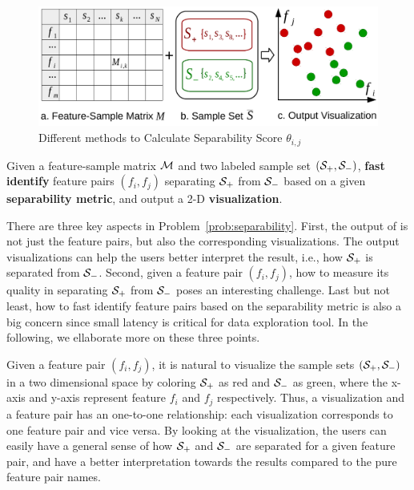 \begin{figure}[h]
	\centering
	\includegraphics[width=\linewidth]{fig/workflow.pdf}
\caption{Different methods to Calculate Separability Score $\theta_{i,j}$}
\label{fig:workflow}
\end{figure} 


\begin{formulation}[Separability]\label{prob:separability}
Given a feature-sample matrix $\mathcal{M}$ and two labeled sample set $(\mathcal{S}_+,\mathcal{S}_-)$, \textbf{fast identify} \topk feature pairs $(f_i,f_j)$ separating $\mathcal{S}_+$ from $\mathcal{S}_-$ based on a given \textbf{separability metric}, and output a 2-D \textbf{visualization}.
\end{formulation}
There are three key aspects in Problem~\ref{prob:separability}. First, the output of \genviz is not just the \topk feature pairs, but also the corresponding visualizations. The output visualizations can help the users better interpret the result, i.e., how $\mathcal{S}_+$ is separated from $\mathcal{S}_-$. Second, given a feature pair $(f_i,f_j)$, how to measure its quality in separating $\mathcal{S}_+$ from $\mathcal{S}_-$ poses an interesting challenge. Last but not least, how to fast identify \topk feature pairs based on the separability metric is also a big concern since small latency is critical for data exploration tool. In the following, we ellaborate more on these three points.

 Given a feature pair $(f_i,f_j)$, it is natural to visualize the sample sets $(\mathcal{S}_+,\mathcal{S}_-)$ in a two dimensional space by coloring $\mathcal{S}_+$ as red and $\mathcal{S}_-$ as green, where the x-axis and y-axis represent feature $f_i$ and $f_j$ respectively. Thus, a visualization and a feature pair has an one-to-one relationship: each visualization corresponds to one feature pair and vice versa. By looking at the visualization, the users can easily have a general sense of how $\mathcal{S}_+$ and $\mathcal{S}_-$ are separated for a given feature pair, and have a better interpretation towards the results compared to the pure feature pair names.


